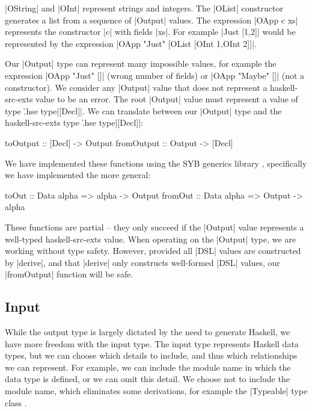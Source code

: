 \documentclass{llncs}
\begin{document}
\noindent|OString| and |OInt| represent strings and integers. The |OList| constructor generates a list from a sequence of |Output| values. The expression |OApp c xs| represents the constructor |c| with fields |xs|. For example |Just [1,2]| would be represented by the expression |OApp "Just" [OList [OInt 1,OInt 2]]|.

Our |Output| type can represent many impossible values, for example the expression |OApp "Just" []| (wrong number of fields) or |OApp "Maybe" []| (not a constructor). We consider any |Output| value that does not represent a haskell-src-exts value to be an error. The root |Output| value must represent a value of type \h{.hse type}|[Decl]|. We can translate between our |Output| type and the haskell-src-exts type \h{.hse type}|[Decl]|:

\begin{code}
toOutput    :: [Decl] -> Output
fromOutput  :: Output -> [Decl]
\end{code}

We have implemented these functions using the SYB generics library \cite{lammel:syb2}, specifically we have implemented the more general:

\begin{code}
toOut    :: Data alpha => alpha -> Output
fromOut  :: Data alpha => Output -> alpha
\end{code}

These functions are partial -- they only succeed if the |Output| value represents a well-typed haskell-src-exts value. When operating on the |Output| type, we are working without type safety. However, provided all |DSL| values are constructed by |derive|, and that |derive| only constructs well-formed |DSL| values, our |fromOutput| function will be safe.

\subsection{Input}

While the output type is largely dictated by the need to generate Haskell, we have more freedom with the input type. The input type represents Haskell data types, but we can choose which details to include, and thus which relationships we can represent. For example, we can include the module name in which the data type is defined, or we can omit this detail. We choose not to include the module name, which eliminates some derivations, for example the |Typeable| type class \cite{lammel:syb}.
\end{document}

